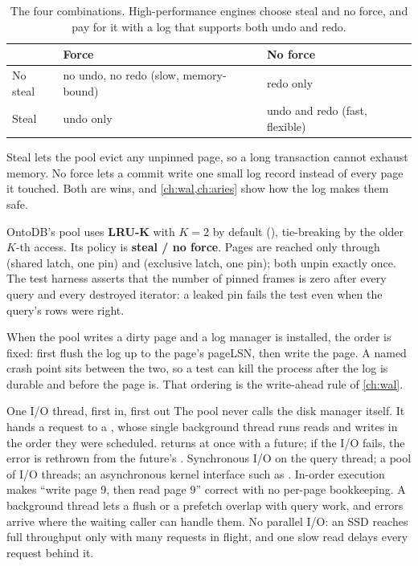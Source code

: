 \begin{table}[ht]
\centering
\begin{tabular}{@{}lll@{}}
\toprule
& Force & No force \\
\midrule
No steal & no undo, no redo (slow, memory-bound) & redo only \\
Steal & undo only & undo and redo (fast, flexible) \\
\bottomrule
\end{tabular}
\caption{The four combinations. High-performance engines choose steal and no force, and pay for it with a log that supports both undo and redo.}
\label{tab:stealforce}
\end{table}

Steal lets the pool evict any unpinned page, so a long transaction cannot
exhaust memory. No force lets a commit write one small log record instead of
every page it touched. Both are wins, and \cref{ch:wal,ch:aries} show how the
log makes them safe.

\begin{ontodb}
OntoDB's pool uses \textbf{LRU-K} with $K = 2$ by default (),
tie-breaking by the older $K$-th access. Its policy is \textbf{steal / no force}.
Pages are reached only through  (shared latch, one pin)
and  (exclusive latch, one pin); both unpin exactly once.
The test harness asserts that the number of pinned frames is zero after every
query and every destroyed iterator: a leaked pin fails the test even when the
query's rows were right.

When the pool writes a dirty page and a log manager is installed, the order is
fixed: first flush the log up to the page's pageLSN, then write the page. A
named crash point sits between the two, so a test can kill the process after the
log is durable and before the page is. That ordering is the write-ahead rule of
\cref{ch:wal}.
\end{ontodb}

\begin{decision}{One I/O thread, first in, first out}
 The pool never calls the disk manager itself. It hands a request
to a , whose single background thread runs reads and writes
in the order they were scheduled.  returns at once with a
future; if the I/O fails, the error is rethrown from the future's .
 Synchronous I/O on the query thread; a pool of I/O
threads; an asynchronous kernel interface such as .
 In-order execution makes ``write page 9, then read page 9'' correct
with no per-page bookkeeping. A background thread lets a flush or a prefetch
overlap with query work, and errors arrive where the waiting caller can handle
them.
 No parallel I/O: an SSD reaches full throughput only with many
requests in flight, and one slow read delays every request behind it.
\end{decision}

